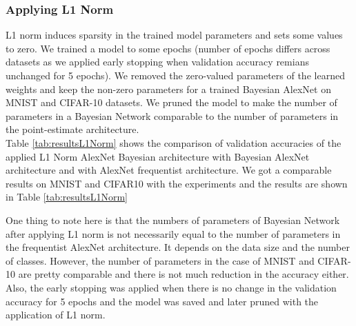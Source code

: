 \subsubsection{Applying L1 Norm}


L1 norm induces sparsity in the trained model parameters and sets some values to zero. We trained a model to some epochs (number of epochs differs across datasets as we applied early stopping when validation accuracy remians unchanged for 5 epochs). We removed the zero-valued parameters of the learned weights and keep the non-zero parameters for a trained Bayesian AlexNet on MNIST and CIFAR-10 datasets. We pruned the model to make the number of parameters in a Bayesian Network comparable to the number of parameters in the point-estimate architecture. \\ Table \ref{tab:resultsL1Norm} shows the comparison of validation accuracies of the applied L1 Norm AlexNet Bayesian architecture with Bayesian AlexNet architecture and with AlexNet frequentist architecture. We got a comparable results on MNIST and CIFAR10 with the experiments and the results are shown in Table \ref{tab:resultsL1Norm}

\begin{table}[H]
\tiny
    \centering
    \renewcommand{\arraystretch}{1.5}
    \renewcommand{\arraystretch}{1.5}
    \caption{Comparison of validation accuracies (in percentage) for AlexNet with variational inference (VI), AlexNet with frequentist inference and BayesianAlexNet with L1 norm applied for MNIST and CIFAR-10 datasets.}
    \label{tab:resultsL1Norm}
\end{table}

One thing to note here is that the numbers of parameters of Bayesian Network after applying L1 norm is not necessarily equal to the number of parameters in the frequentist AlexNet architecture. It depends on the data size and the number of classes. However, the number of parameters in the case of MNIST and CIFAR-10 are pretty comparable and there is not much reduction in the accuracy either. Also, the early stopping was applied when there is no change in the validation accuracy for 5 epochs and the model was saved and later pruned with the application of L1 norm.

